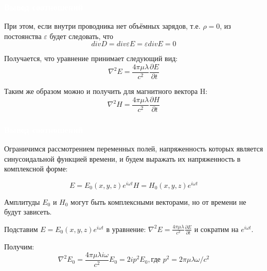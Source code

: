 \documentclass[aspectratio=169]{beamer}
\begin{document}
\begin{frame}
\frametitle{\textcolor{white}{Вывод соотношений}}
При этом, если внутри проводника нет объёмных зарядов, т.е. $\rho = 0$, из постоянства $\varepsilon$ будет следовать, что
\begin{equation*}
div D = div \varepsilon E = \varepsilon div E = 0
\end{equation*}

Получается, что уравнение принимает следующий вид:
\begin{equation*}
\nabla^2 E = \frac{4 \pi \mu \lambda}{c^2} \frac{\partial E}{\partial t}
\end{equation*}

Таким же образом можно и получить для магнитного вектора H:
\begin{equation*}
\nabla^2 H = \frac{4 \pi \mu \lambda}{c^2} \frac{\partial H}{\partial t}
\end{equation*}
\end{frame}

\begin{frame}
\frametitle{\textcolor{white}{Вывод соотношений}}
Ограничимся рассмотрением переменных полей, напряженность которых является синусоидальной функцией времени, и будем выражать их напряженность в комплексной форме:

\begin{equation*}
E = E_0(x, y, z)e^{i \omega t}
H = H_0(x, y, z) e^{i \omega t}
\end{equation*}

Амплитуды $E_0$ и $H_0$ могут быть комплексными векторами, но от времени не будут зависеть.


Подставим $E = E_0(x, y, z)e^{i \omega t}$ в уравнение: $\nabla^2 E = \frac{4 \pi \mu \lambda}{c^2} \frac{\partial E}{\partial t}$ и сократим на $e^{i \omega t}$.

Получим:
\begin{equation*}
\nabla^2 E_0 = \frac{4 \pi \mu \lambda i \omega}{c^2} E_0 = 2ip^2E_0, \text{где } p^2 = 2 \pi \mu \lambda \omega/c^2
\end{equation*}
\end{frame}
\end{document}
